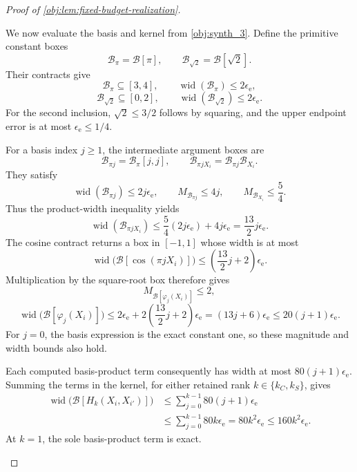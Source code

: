 \documentclass[11pt]{article}
\begin{document}
\begin{proof}[Proof of \cref{obj:lem:fixed-budget-realization}]
\begin{enumerate}
We now evaluate the basis and kernel from \cref{obj:synth_3}. Define the primitive constant boxes
\[
\mathcal B_\pi=\mathcal B[\pi],
\qquad
\mathcal B_{\sqrt2}=\mathcal B[\sqrt2].
\]
Their contracts give
\[
\mathcal B_\pi\subseteq[3,4],
\qquad
\operatorname{wid}(\mathcal B_\pi)\le2\epsilon_{\mathrm e},
\]
\[
\mathcal B_{\sqrt2}\subseteq[0,2],
\qquad
\operatorname{wid}(\mathcal B_{\sqrt2})\le2\epsilon_{\mathrm e}.
\]
For the second inclusion, \(\sqrt2\le3/2\) follows by squaring, and the upper endpoint error is at most \(\epsilon_{\mathrm e}\le1/4\).

For a basis index \(j\ge1\), the intermediate argument boxes are
\[
\mathcal B_{\pi j}=\mathcal B_\pi[j,j],
\qquad
\mathcal B_{\pi jX_i}=\mathcal B_{\pi j}\mathcal B_{X_i}.
\]
They satisfy
\[
\operatorname{wid}(\mathcal B_{\pi j})\le2j\epsilon_{\mathrm e},
\qquad
M_{\mathcal B_{\pi j}}\le4j,
\qquad
M_{\mathcal B_{X_i}}\le\frac54.
\]
Thus the product-width inequality yields
\[
\operatorname{wid}(\mathcal B_{\pi jX_i})
\le
\frac54(2j\epsilon_{\mathrm e})+4j\epsilon_{\mathrm e}
=\frac{13}{2}j\epsilon_{\mathrm e}.
\]
The cosine contract returns a box in \([-1,1]\) whose width is at most
\[
\operatorname{wid}\bigl(\mathcal B[\cos(\pi jX_i)]\bigr)
\le\left(\frac{13}{2}j+2\right)\epsilon_{\mathrm e}.
\]
Multiplication by the square-root box therefore gives
\[
M_{\mathcal B[\varphi_j(X_i)]}\le2,
\]
\[
\operatorname{wid}\bigl(\mathcal B[\varphi_j(X_i)]\bigr)
\le
2\epsilon_{\mathrm e}
+2\left(\frac{13}{2}j+2\right)\epsilon_{\mathrm e}
=(13j+6)\epsilon_{\mathrm e}
\le20(j+1)\epsilon_{\mathrm e}.
\]
For \(j=0\), the basis expression is the exact constant one, so these magnitude and width bounds also hold.

Each computed basis-product term consequently has width at most
\(80(j+1)\epsilon_{\mathrm e}\). Summing the terms in the kernel, for either retained rank \(k\in\{k_C,k_S\}\), gives
\[
\begin{aligned}
\operatorname{wid}\bigl(\mathcal B[H_k(X_i,X_{i'})]\bigr)
&\le\sum_{j=0}^{k-1}80(j+1)\epsilon_{\mathrm e}\\
&\le\sum_{j=0}^{k-1}80k\epsilon_{\mathrm e}
=80k^2\epsilon_{\mathrm e}
\le160k^2\epsilon_{\mathrm e}.
\end{aligned}
\]
At \(k=1\), the sole basis-product term is exact.


\end{enumerate}
\end{proof}
\end{document}
